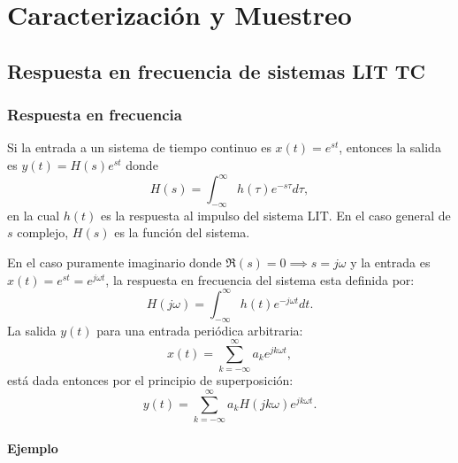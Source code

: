 \documentclass[11pt,a4paper,openany]{book}
\begin{document}

\part{Caracterización y Muestreo}


\chapter{Respuesta en frecuencia de sistemas LIT TC}

\section{Respuesta en frecuencia}

Si la entrada a un sistema de tiempo continuo es $x(t) = e^{st}$, entonces la salida es $y(t) = H(s) e^{st}$ donde
\begin{equation}
	H(s) = \int_{-\infty}^{\infty} h(\tau) e^{-s\tau} d\tau,
\end{equation}
en la cual $h(t)$ es la respuesta al impulso del sistema LIT. En el caso general de $s$ complejo, $H(s)$ es la funci\'{o}n del sistema. 

En el caso puramente imaginario donde $\Re(s) = 0 \implies s = j\omega$ y la entrada es $x(t) = e^{st} = e^{j\omega t}$, la respuesta en frecuencia del sistema esta definida por:
\begin{equation}
	H(j\omega) = \int_{-\infty}^{\infty} h(t) e^{-j\omega t} dt.
\end{equation}
La salida $y(t)$ para una entrada peri\'{o}dica arbitraria:
\begin{equation}
	x(t) = \sum_{k=-\infty}^{\infty} a_{k} e^{jk\omega t},
\end{equation}
est\'{a} dada entonces por el principio de superposici\'{o}n:
\begin{equation}
	y(t) = \sum_{k=-\infty}^{\infty} a_{k} H(jk\omega) e^{jk\omega t}.
\end{equation}

\subsection{Ejemplo}
\end{document}
